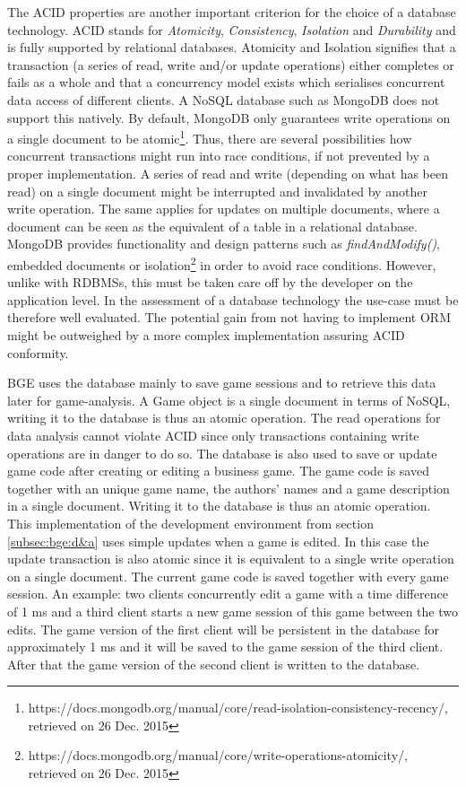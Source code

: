 The ACID properties are another important criterion for the choice of a database technology. ACID stands for \textit{Atomicity}, \textit{Consistency}, \textit{Isolation} and \textit{Durability} and is fully supported by relational databases. Atomicity and Isolation signifies that a transaction (a series of read, write and/or update operations) either completes or fails as a whole and that a concurrency model exists which serialises concurrent data access of different clients. A NoSQL database such as MongoDB does not support this natively. By default, MongoDB only guarantees write operations on a single document to be atomic\footnote{https://docs.mongodb.org/manual/core/read-isolation-consistency-recency/, retrieved on 26 Dec. 2015}. Thus, there are several possibilities how concurrent transactions might run into race conditions, if not prevented by a proper implementation. A series of read and write (depending on what has been read) on a single document might be interrupted and invalidated by another write operation. The same applies for updates on multiple documents, where a document can be seen as the equivalent of a table in a relational database. MongoDB provides functionality and design patterns such as \textit{findAndModify()}, embedded documents or isolation\footnote{https://docs.mongodb.org/manual/core/write-operations-atomicity/, retrieved on 26 Dec. 2015} in order to avoid race conditions. However, unlike with RDBMSs, this must be taken care off by the developer on the application level. In the assessment of a database technology the use-case must be therefore well evaluated. The potential gain from not having to implement ORM might be outweighed by a more complex implementation assuring ACID conformity.

BGE uses the database mainly to save game sessions and to retrieve this data later for game-analysis. A Game object is a single document in terms of NoSQL, writing it to the database is thus an atomic operation. The read operations for data analysis cannot violate ACID since only transactions containing write operations are in danger to do so. The database is also used to save or update game code after creating or editing a business game. The game code is saved together with an unique game name, the authors' names and a game description in a single document. Writing it to the database is thus an atomic operation. This implementation of the development environment from section \ref{subsec:bge:d&a} uses simple updates when a game is edited. In this case the update transaction is also atomic since it is equivalent to a single write operation on a single document. The current game code is saved together with every game session. An example: two clients concurrently edit a game with a time difference of 1 ms and a third client starts a new game session of this game between the two edits. The game version of the first client will be persistent in the database for approximately 1 ms and it will be saved to the game session of the third client. After that the game version of the second client is written to the database.

